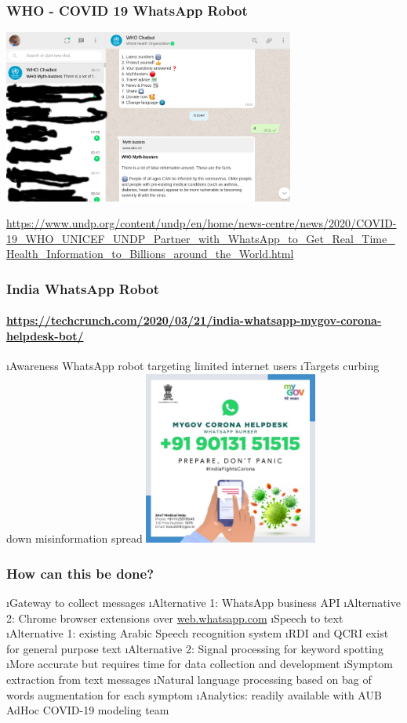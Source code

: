 \documentclass[t,xcolor=pdftex,dvipsnames,table]{beamer}
\begin{document}
\begin{wideframe}
  \frametitle{WHO - COVID 19 WhatsApp Robot} 
  \includegraphics[width=.8\textwidth,height=5.7cm]{jpgs/WHO_Bot} 
  
  {\tiny
  \url{https://www.undp.org/content/undp/en/home/news-centre/news/2020/COVID-19_WHO_UNICEF_UNDP_Partner_with_WhatsApp_to_Get_Real_Time_Health_Information_to_Billions_around_the_World.html} 
  } 
\end{wideframe} 

\begin{wideframe}
  \frametitle{India WhatsApp Robot} 
  \framesubtitle{ \url{https://techcrunch.com/2020/03/21/india-whatsapp-mygov-corona-helpdesk-bot/} 
  }
  \be 
  \i Awareness WhatsApp robot targeting limited internet users
  \i Targets curbing down misinformation spread
  \ee
  \includegraphics[width=.8\textwidth,height=5.7cm]{jpgs/ETnT2hOUEAAuoEe}
  
\end{wideframe} 



\begin{wideframe}
  \frametitle{How can this be done?}
  \be
  \i Gateway to collect messages 
    \be \i Alternative 1: WhatsApp business API
        \i Alternative 2: Chrome browser extensions over \url{web.whatsapp.com} 
    \ee
  \i Speech to text 
    \be \i Alternative 1: existing Arabic Speech recognition system 
        \be \i RDI and QCRI exist for general purpose text 
        \ee 
        \i Alternative 2: Signal processing for keyword spotting 
        \be \i More accurate but requires time for data collection and development 
        \ee
    \ee
  \i Symptom extraction from text messages 
    \be \i Natural language processing based on bag of words augmentation for each symptom
    \ee 
  \i Analytics: readily available with AUB AdHoc COVID-19 modeling team
  \ee
\end{wideframe}
\end{document}
